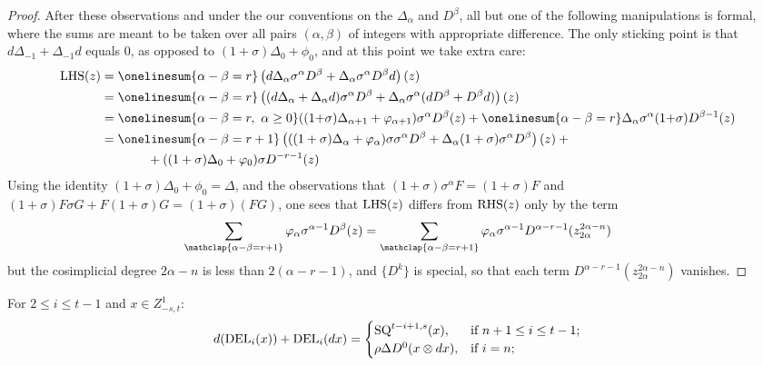 \documentclass[10pt]{article}
\newcommand{\twist}{\sigma}
\begin{document}
\begin{AdamsSSEQ operations final}
\begin{proof}
After these observations and under the our conventions on the $\Delta_\alpha$ and $D^\beta$, all but one of the following manipulations is formal, where the sums are meant to be taken over all pairs $(\alpha,\beta)$ of integers with appropriate difference. The only sticking point is that $d\Delta_{-1}+\Delta_{-1}d$ equals $0$, as opposed to $(1{+}\twist)\Delta_0+\phi_0$, and at this point we take extra care:
%
\begin{alignat*}{2}
\textup{LHS}(z)
&=
\onelinesum{\alpha-\beta=r}\left(d\Delta_\alpha\twist^\alpha D^\beta+\Delta_\alpha\twist^\alpha D^\beta d\right)(z)%
\\
&=
\onelinesum{\alpha-\beta=r}\left((d\Delta_\alpha+
\Delta_\alpha d)\twist^\alpha D^\beta+
\Delta_\alpha\twist^\alpha (dD^\beta+
D^\beta d)\right)(z)%
\\
&=
\onelinesum{\alpha-\beta=r,\ \alpha\geq0}((1{+}\twist)\Delta_{\alpha+1}+\phi_{\alpha+1})\twist^\alpha D^\beta(z)+\onelinesum{\alpha-\beta=r}\Delta_\alpha\twist^\alpha(1{+}\twist) D^{\beta-1}(z)%
\\
&=
\onelinesum{\alpha-\beta=r+1}\left(((1+\twist)\Delta_{\alpha}+ \phi_{\alpha})\twist\twist^{\alpha} D^\beta+\Delta_\alpha(1+\twist)\twist^\alpha D^{\beta}\right)(z) + {}%
\\
&\ \ \ \ \ \ \ \ \ \ \ +
((1+\twist)\Delta_{0}+\phi_{0})\twist D^{-r-1}(z)
\end{alignat*}
Using the identity $(1+\twist)\Delta_{0}+\phi_{0}=\Delta$, and the observations that $(1+\twist)\twist^\alpha F=(1+\twist)F$ and $(1+\twist)F\twist G+F(1+\twist)G=(1+\twist)(FG)$, one sees that $\textup{LHS}(z)$ differs from $\textup{RHS}(z)$ only by the term
\[\sum_{\mathclap{\alpha-\beta=r+1}} \phi_{\alpha}\sigma^{\alpha-1}D^{\beta}(z)=\sum_{\mathclap{\alpha-\beta=r+1}} \phi_{\alpha}\sigma^{\alpha-1}D^{\alpha-r-1}(z_{2\alpha}^{2\alpha-n})\]
but the cosimplicial degree $2\alpha-n$ is less than $2(\alpha-r-1)$, and $\{D^k\}$ is special, so that each term $D^{\alpha-r-1}(z_{2\alpha}^{2\alpha-n})$ vanishes.
\end{proof}
\begin{cor}\label{dvsDEL}
For $2\leq i\leq t-1$ and $x\in Z^1_{-s,t}$:
\[d(\textup{DEL}_i(x))+ \textup{DEL}_i(dx)=\begin{cases}
\textup{SQ}^{t-i+1,s}(x),&\textup{if }n+1\leq i \leq t-1;\\
\rho\Delta D^0(x\otimes dx),&\textup{if }i=n;\\

\end{cases}\]
\end{cor}
\end{AdamsSSEQ operations final}
\end{document}
